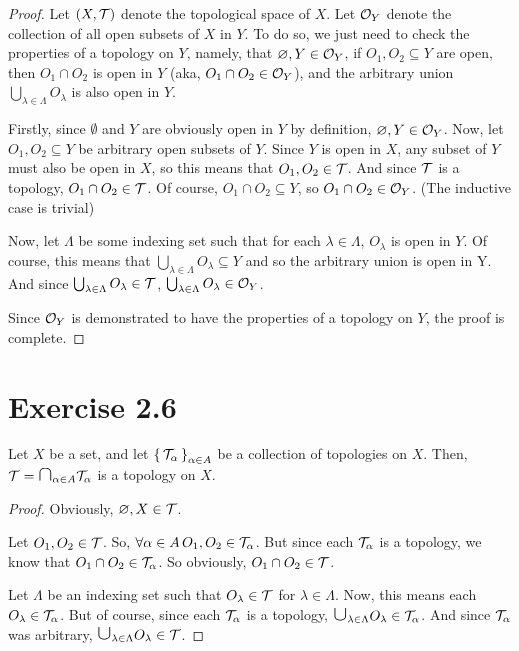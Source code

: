 \documentclass{article}
\begin{document}
\begin{proof}
    Let $(X, \mathcal{T})$ denote the topological space of $X$.
    Let $\mathcal{O}_Y$ denote the collection of all open subsets of $X$ in $Y$.
    To do so, we just need to check the properties of a topology on $Y$, namely, that
    $\varnothing, Y \in \mathcal{O}_Y$, if $O_1, O_2 \subseteq Y$ are open, then $O_1 \cap O_2$ is 
    open in $Y$ (aka, $O_1 \cap O_2 \in \mathcal{O}_Y$), and the arbitrary union $\bigcup_{\lambda \in \Lambda} O_\lambda$ is also open in $Y$.

    Firstly, since $\emptyset$ and $Y$ are obviously open in $Y$ by definition, $\varnothing, Y \in \mathcal{O}_Y$. Now, let $O_1, O_2 \subseteq Y$ be arbitrary open subsets of $Y$. Since $Y$ is open in $X$, any subset of $Y$ must also be open in $X$,
    so this means that $O_1, O_2 \in \mathcal{T}$. And since $\mathcal{T}$ is a topology, $O_1 \cap O_2 \in \mathcal{T}$. Of course, $O_1 \cap O_2 \subseteq Y$, so $O_1 \cap O_2 \in \mathcal{O}_Y$. (The inductive
    case is trivial)

    Now, let $\Lambda$ be some indexing set such that for each $\lambda \in \Lambda$,
    $O_{\lambda}$ is open in $Y$. Of course, this means that $\bigcup_{\lambda \in \Lambda} O_{\lambda} \subseteq Y$ and so the arbitrary union is open in Y. And since 
    $\bigcup_{\lambda \in \Lambda} O_{\lambda} \in \mathcal{T}$, $\bigcup_{\lambda \in \Lambda} O_{\lambda} \in \mathcal{O}_Y$. 

    Since $\mathcal{O}_Y$ is demonstrated to have the properties of a topology on $Y$, the proof
    is complete.
\end{proof}

\section{Exercise 2.6}

\begin{claim}
    Let $X$ be a set, and let $\set{\mathcal{T}_\alpha}_{\alpha \in A}$ be a collection of 
    topologies on $X$. Then, $\mc T = \medcap_{\alpha \in A} \mc T_\alpha$ is a topology on $X$.
\end{claim}

\begin{proof}
    Obviously, $\varnothing, X \in \mathcal{T}$.
    
    Let $O_1, O_2 \in \mathcal{T}$.
    So, $\forall \alpha \in A \, O_1, O_2 \in \mathcal{T}_\alpha$. But since each $\mathcal{T}_\alpha$ 
    is a topology, we know that $O_1 \cap O_2 \in \mathcal{T}_\alpha$. So obviously, $O_1 \cap O_2 \in \mathcal{T}$.

    Let $\Lambda$ be an indexing set such that $O_\lambda \in \mathcal{T}$ for $\lambda \in \Lambda$.
    Now, this means each $O_\lambda \in \mathcal{T}_\alpha$.
    But of course, since each $\mathcal{T}_\alpha$ is a topology, $\medcup_{\lambda \in \Lambda} O_\lambda \in \mc T_\alpha$. And since $\mathcal{T}_\alpha$ was arbitrary, $\medcup_{\lambda \in \Lambda} O_\lambda \in \mc T$.
\end{proof}
\end{document}
